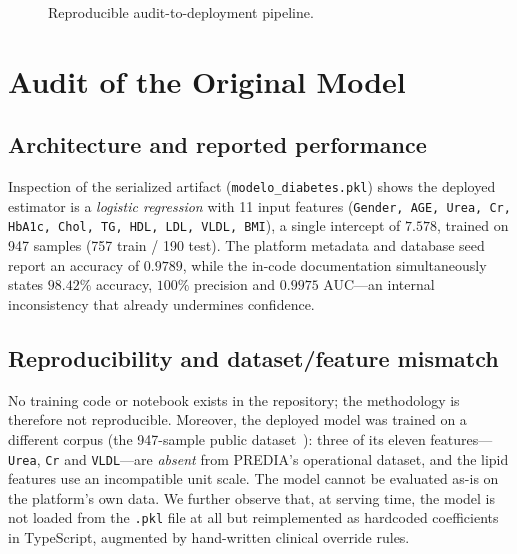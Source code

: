 \documentclass[conference]{IEEEtran}
\begin{document}
\begin{figure}[!t]
\centering
{}
\caption{Reproducible audit-to-deployment pipeline.}
\label{fig:pipeline}
\end{figure}

\section{Audit of the Original Model}
\subsection{Architecture and reported performance}
Inspection of the serialized artifact (\texttt{modelo\_diabetes.pkl}) shows the
deployed estimator is a \emph{logistic regression} with 11 input features
(\texttt{Gender, AGE, Urea, Cr, HbA1c, Chol, TG, HDL, LDL, VLDL, BMI}), a single
intercept of $7.578$, trained on 947 samples (757 train / 190 test). The
platform metadata and database seed report an accuracy of $0.9789$, while the
in-code documentation simultaneously states $98.42\%$ accuracy, $100\%$
precision and $0.9975$ AUC---an internal inconsistency that already undermines
confidence.

\subsection{Reproducibility and dataset/feature mismatch}
No training code or notebook exists in the repository; the methodology is
therefore not reproducible. Moreover, the deployed model was trained on a
different corpus (the 947-sample public dataset~\cite{rashid2020diabetes}):
three of its eleven features---\texttt{Urea}, \texttt{Cr} and \texttt{VLDL}---are
\emph{absent} from PREDIA's operational dataset, and the lipid features use an
incompatible unit scale. The model cannot be evaluated as-is on the platform's
own data. We further observe that, at serving time, the model is not loaded from
the \texttt{.pkl} file at all but reimplemented as hardcoded coefficients in
TypeScript, augmented by hand-written clinical override rules.
\end{document}
